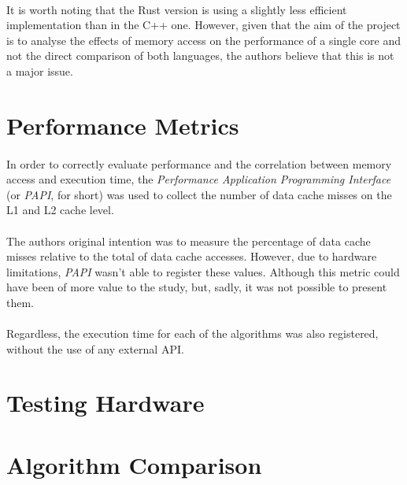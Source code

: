 \documentclass{report}
\begin{document}
		\paragraph{}It is worth noting that the Rust version is using a slightly less efficient implementation than in the C++ one. However, given that the aim of the project is to analyse the effects of memory access on the performance of a single core and not the direct comparison of both languages, the authors believe that this is not a major issue.
	
		\section{Performance Metrics}
		
			\paragraph{}In order to correctly evaluate performance and the correlation between memory access and execution time,  the \emph{Performance Application Programming Interface} (or \emph{PAPI}, for short) was used to collect the number of data cache misses on the L1 and L2 cache level.
			
			\paragraph{}The authors original intention was to measure the percentage of data cache misses relative to the total of data cache accesses. However, due to hardware limitations, \emph{PAPI} wasn't able to register these values. Although this metric could have been of more value to the study, but, sadly, it was not possible to present them.
			
			\paragraph{}Regardless, the execution time for each of the algorithms was also registered, without the use of any external API.
			
		\section{Testing Hardware}
			
		\section{Algorithm Comparison}
		
\end{document}
